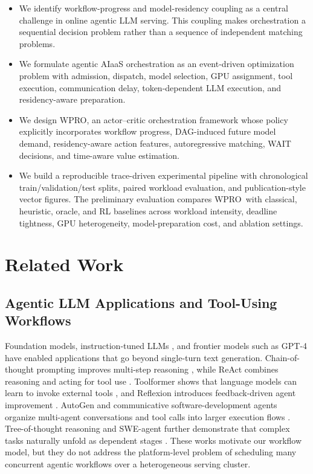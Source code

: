 \documentclass[10pt,conference]{IEEEtran}
\newcommand{\WPRO}{\textsc{WPRO}}
\begin{document}
\begin{itemize}
    \item We identify workflow-progress and model-residency coupling as a central challenge in online agentic LLM serving. This coupling makes orchestration a sequential decision problem rather than a sequence of independent matching problems.
    \item We formulate agentic AIaaS orchestration as an event-driven optimization problem with admission, dispatch, model selection, GPU assignment, tool execution, communication delay, token-dependent LLM execution, and residency-aware preparation.
    \item We design \WPRO, an actor--critic orchestration framework whose policy explicitly incorporates workflow progress, DAG-induced future model demand, residency-aware action features, autoregressive matching, WAIT decisions, and time-aware value estimation.
    \item We build a reproducible trace-driven experimental pipeline with chronological train/validation/test splits, paired workload evaluation, and publication-style vector figures. The preliminary evaluation compares \WPRO\ with classical, heuristic, oracle, and RL baselines across workload intensity, deadline tightness, GPU heterogeneity, model-preparation cost, and ablation settings.
\end{itemize}

\section{Related Work}

\subsection{Agentic LLM Applications and Tool-Using Workflows}

Foundation models, instruction-tuned LLMs \cite{ouyang2022training}, and frontier models such as GPT-4 \cite{openai2023gpt4} have enabled applications that go beyond single-turn text generation. Chain-of-thought prompting improves multi-step reasoning \cite{wei2022chain}, while ReAct combines reasoning and acting for tool use \cite{yao2023react}. Toolformer shows that language models can learn to invoke external tools \cite{schick2023toolformer}, and Reflexion introduces feedback-driven agent improvement \cite{shinn2023reflexion}. AutoGen and communicative software-development agents organize multi-agent conversations and tool calls into larger execution flows \cite{wu2023autogen,qian2024communicative}. Tree-of-thought reasoning and SWE-agent further demonstrate that complex tasks naturally unfold as dependent stages \cite{yao2024tree,yang2024sweagent}. These works motivate our workflow model, but they do not address the platform-level problem of scheduling many concurrent agentic workflows over a heterogeneous serving cluster.
\end{document}
